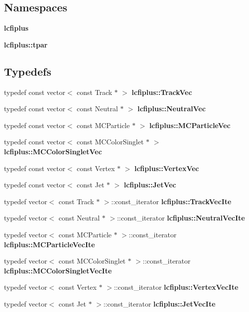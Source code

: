 \subsection*{Namespaces}
\begin{DoxyCompactItemize}
\item 
 \textbf{ lcfiplus}
\item 
 \textbf{ lcfiplus\+::tpar}
\end{DoxyCompactItemize}
\subsection*{Typedefs}
\begin{DoxyCompactItemize}
\item 
typedef const vector$<$ const Track $\ast$ $>$ \textbf{ lcfiplus\+::\+Track\+Vec}
\item 
typedef const vector$<$ const Neutral $\ast$ $>$ \textbf{ lcfiplus\+::\+Neutral\+Vec}
\item 
typedef const vector$<$ const M\+C\+Particle $\ast$ $>$ \textbf{ lcfiplus\+::\+M\+C\+Particle\+Vec}
\item 
typedef const vector$<$ const M\+C\+Color\+Singlet $\ast$ $>$ \textbf{ lcfiplus\+::\+M\+C\+Color\+Singlet\+Vec}
\item 
typedef const vector$<$ const Vertex $\ast$ $>$ \textbf{ lcfiplus\+::\+Vertex\+Vec}
\item 
typedef const vector$<$ const Jet $\ast$ $>$ \textbf{ lcfiplus\+::\+Jet\+Vec}
\item 
typedef vector$<$ const Track $\ast$ $>$\+::const\+\_\+iterator \textbf{ lcfiplus\+::\+Track\+Vec\+Ite}
\item 
typedef vector$<$ const Neutral $\ast$ $>$\+::const\+\_\+iterator \textbf{ lcfiplus\+::\+Neutral\+Vec\+Ite}
\item 
typedef vector$<$ const M\+C\+Particle $\ast$ $>$\+::const\+\_\+iterator \textbf{ lcfiplus\+::\+M\+C\+Particle\+Vec\+Ite}
\item 
typedef vector$<$ const M\+C\+Color\+Singlet $\ast$ $>$\+::const\+\_\+iterator \textbf{ lcfiplus\+::\+M\+C\+Color\+Singlet\+Vec\+Ite}
\item 
typedef vector$<$ const Vertex $\ast$ $>$\+::const\+\_\+iterator \textbf{ lcfiplus\+::\+Vertex\+Vec\+Ite}
\item 
typedef vector$<$ const Jet $\ast$ $>$\+::const\+\_\+iterator \textbf{ lcfiplus\+::\+Jet\+Vec\+Ite}
\end{DoxyCompactItemize}
